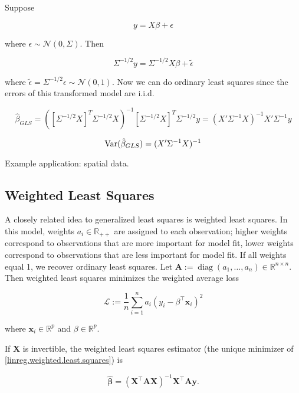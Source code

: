 Suppose

\[
y = X \beta + \epsilon
\]

where \(\epsilon \sim \mathcal{N}(0, \Sigma)\). Then 

\[
\Sigma^{-1/2} y = \Sigma^{-1/2} X \beta + \tilde{\epsilon}
\]

where \(\tilde{\epsilon} =  \Sigma^{-1/2} \epsilon \sim \mathcal{N}(0,1)\). Now we can do ordinary least squares since the errors of this transformed model are i.i.d.

\[
\hat{\beta}_{GLS}=  \left( \left[  \Sigma^{-1/2} X \right]^T  \Sigma^{-1/2} X \right)^{-1} \left[  \Sigma^{-1/2} X \right] ^T \Sigma^{-1/2} y = (X' \Sigma^{-1}X)^{-1}X' \Sigma^{-1}y 
\]

\[
\mathrm{Var}(\hat{\beta}_{GLS}) = (X' \Sigma^{-1} X)^{-1}
\]

Example application: spatial data. 

\subsection{Weighted Least Squares}\label{linreg.sec.weighted.ls}

A closely related idea to generalized least squares is weighted least squares. In this model, weights \(a_i \in \mathbb{R}_{++}\) are assigned to each observation; higher weights correspond to observations that are more important for model fit, lower weights correspond to observations that are less important for model fit. If all weights equal 1, we recover ordinary least squares. Let \( \boldsymbol{A} := \operatorname{diag}(a_{1}, \ldots, a_n) \in \mathbb{R}^{n \times n}\). Then weighted least squares minimizes the weighted average loss

\begin{equation}\label{linreg.weighted.least.squares}
\mathcal{L} := \frac{1}{n} \sum_{i=1}^n a_i \left(y_i - \beta ^\top \boldsymbol{x}_i \right)^2
\end{equation}

where \(\boldsymbol{x}_i  \in \mathbb{R}^p\) and \(\beta \in \mathbb{R}^p\).

\begin{proposition}

If \(\boldsymbol{X}\) is invertible, the weighted least squares estimator (the unique minimizer of \eqref{linreg.weighted.least.squares}) is

\[
\hat{\boldsymbol{\beta}} = \left( \boldsymbol{X}^\top {\boldsymbol{A}} \boldsymbol{X} \right)^{-1}\boldsymbol{X}^\top \boldsymbol{A} \boldsymbol{y}.
\]

\end{proposition}

